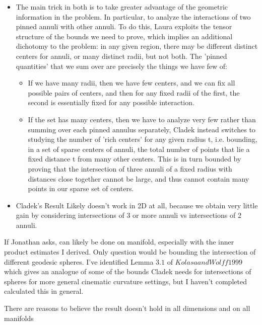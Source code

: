 \documentclass[11pt]{article}
\begin{document}
\begin{itemize}
    \item The main trick in both is to take greater advantage of the geometric information in the problem. In particular, to analyze the interactions of two pinned annuli with other annuli. To do this, Laura exploits the tensor structure of the bounds we need to prove, which implies an additional dichotomy to the problem: in any given region, there may be different distinct centers for annuli, or many distinct radii, but not both. The 'pinned quantities' that we sum over are precisely the things we have few of:

    \begin{itemize}
        \item If we have many radii, then we have few centers, and we can fix all possible pairs of centers, and then for any fixed radii of the first, the second is essentially fixed for any possible interaction.

        \item If the set has many centers, then we have to analyze very few rather than summing over each pinned annulus separately, Cladek instead switches to studying the number of 'rich centers' for any given radius t, i.e. bounding, in a set of sparse centers of annuli, the total number of points that lie a fixed distance t from many other centers. This is in turn bounded by proving that the intersection of three annuli of a fixed radius with distances close together cannot be large, and thus cannot contain many points in our sparse set of centers.
    \end{itemize}

    \item Cladek's Result Likely doesn't work in 2D at all, because we obtain very little gain by considering intersections of 3 or more annuli vs intersections of 2 annuli.
\end{itemize}

If Jonathan asks, can likely be done on manifold, especially with the inner product estimates I derived. Only question would be bounding the intersection of different geodesic spheres. I've identified Lemma $3.1$ of $Kolasa and Wolff 1999$ which gives an analogue of some of the bounds Cladek needs for intersections of spheres for more general cinematic curvature settings, but I haven't completed calculated this in general.

There are reasons to believe the result doesn't hold in all dimensions and on all manifolds
\end{document}
